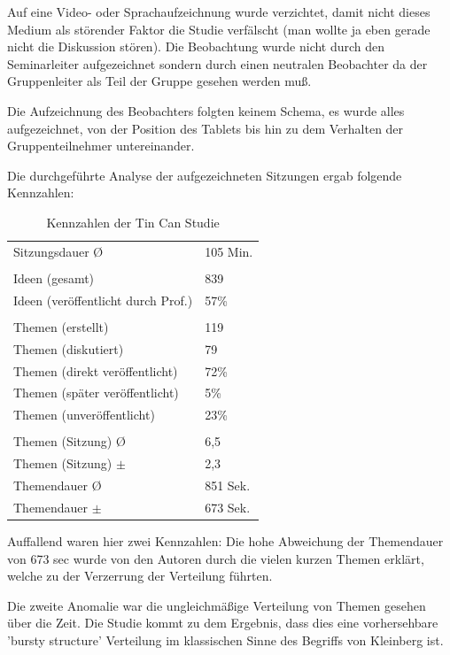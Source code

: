 Auf eine Video- oder Sprachaufzeichnung wurde verzichtet, damit nicht dieses
Medium als störender Faktor die Studie \cite{HarGorSch2012} verfälscht (man wollte ja eben gerade
nicht die Diskussion stören). Die Beobachtung wurde nicht durch den
Seminarleiter aufgezeichnet sondern durch einen neutralen Beobachter da der
Gruppenleiter als Teil der Gruppe gesehen werden muß.

Die Aufzeichnung des Beobachters folgten keinem Schema, es wurde alles
aufgezeichnet, von der Position des Tablets bis hin zu dem Verhalten der
Gruppenteilnehmer untereinander.

Die durchgeführte Analyse der aufgezeichneten Sitzungen ergab folgende Kennzahlen:

\begin{table}[htp]
  \begin{tabular}{ l  l }
    Sitzungsdauer \O & 105 Min.\\
    \\
    Ideen  (gesamt) &  839 \\
    Ideen  (veröffentlicht durch Prof.) & 57\% \\
    \\
    Themen (erstellt) & 119 \\
    Themen (diskutiert) & 79 \\
    Themen (direkt veröffentlicht) & 72\% \\
    Themen (später veröffentlicht) & 5\% \\ 
    Themen (unveröffentlicht) & 23\% \\
    \\
    Themen (Sitzung) \O & 6,5 \\
    Themen (Sitzung) $\pm$ & 2,3 \\
    Themendauer \O & 851 Sek. \\
    Themendauer $\pm$ & 673 Sek. \\
  \end{tabular}
  \caption{Kennzahlen der Tin Can Studie}
\end{table}

Auffallend waren hier zwei Kennzahlen: Die hohe Abweichung der Themendauer von
673  sec wurde von den Autoren durch die vielen kurzen Themen erklärt, welche zu
der Verzerrung der Verteilung führten.

Die zweite Anomalie war die ungleichmäßige Verteilung von Themen gesehen über
die Zeit. Die Studie\cite{HarGorSch2012} kommt zu dem Ergebnis, dass dies eine vorhersehbare 'bursty
structure' Verteilung im klassischen Sinne des Begriffs von Kleinberg
\cite{Klei2003} ist.

